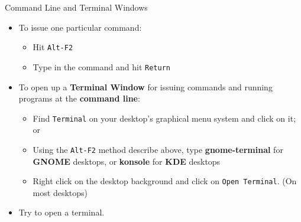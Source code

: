 \begin{frame}
   {Command Line and Terminal Windows}
   \begin{itemize}
      \item
      To issue one particular command:
      \begin{itemize}
         \item
         Hit \verb?Alt-F2?
         \item
         Type in the command and hit \verb?Return?
      \end{itemize}
      \item
      To open up a \textbf{Terminal Window} for issuing
      commands and running programs at the \textbf{command
      line}:
      \begin{itemize}
         \item
         Find \verb?Terminal? on your desktop's graphical menu
         system and click on it; or
         \item
         Using the \verb?Alt-F2? method describe above, type
         \textbf{gnome-terminal} for \textbf{GNOME} desktops,
         or \textbf{konsole} for \textbf{KDE} desktops
         \item
         Right click on the desktop background and click on
         \verb?Open Terminal?. (On most desktops)
      \end{itemize}
      \item
      Try to open a terminal.

   \end{itemize}
\end{frame}

\cprotect{}


